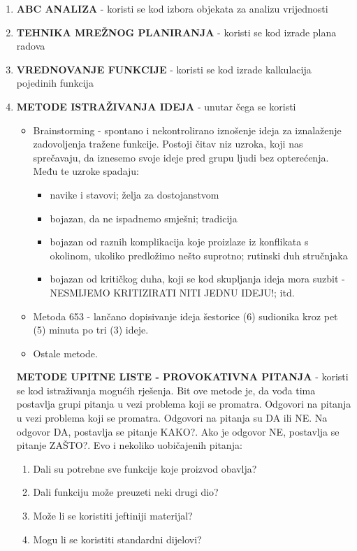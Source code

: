 \documentclass[a4paper,12pt]{article}
\numberwithin{figure}{section}
\begin{document}
\begin{enumerate}
\item \textbf{ABC ANALIZA} - koristi se kod izbora objekata za analizu vrijednosti
\item \textbf{TEHNIKA MREŽNOG PLANIRANJA} - koristi se kod izrade plana radova
\item \textbf{VREDNOVANJE FUNKCIJE} - koristi se kod izrade kalkulacija pojedinih funkcija
\item \textbf{METODE ISTRAŽIVANJA IDEJA} - unutar čega se koristi
\begin{itemize}
\item Brainstorming - spontano i nekontrolirano iznošenje ideja za iznalaženje zadovoljenja tražene funkcije. Postoji čitav niz uzroka, koji nas sprečavaju, da iznesemo svoje ideje pred grupu ljudi bez opterećenja. Među te uzroke spadaju:
\begin{itemize}
\item navike i stavovi; želja za dostojanstvom
\item bojazan, da ne ispadnemo smješni; tradicija
\item bojazan od raznih komplikacija koje proizlaze iz konflikata s okolinom, ukoliko predložimo nešto suprotno; rutinski duh stručnjaka
\item bojazan od kritičkog duha, koji se kod skupljanja ideja mora suzbit - NESMIJEMO KRITIZIRATI NITI JEDNU IDEJU!; itd.
\end{itemize}  
\item Metoda 653 - lančano dopisivanje ideja šestorice (6) sudionika kroz pet (5) minuta po tri (3) ideje.
\item Ostale metode. 
\end{itemize}
\textbf{METODE UPITNE LISTE - PROVOKATIVNA PITANJA} - koristi se kod istraživanja mogućih rješenja. Bit ove metode je, da vođa tima postavlja grupi pitanja u vezi problema koji se promatra. Odgovori na pitanja u vezi problema koji se promatra. Odgovori na pitanja su DA ili NE. Na odgovor DA, postavlja se pitanje KAKO?.  Ako je odgovor NE, postavlja se pitanje ZAŠTO?. Evo i nekoliko uobičajenih pitanja:
\begin{center}
\begin{enumerate}
\item Dali su potrebne sve funkcije koje proizvod obavlja?
\item Dali funkciju može preuzeti neki drugi dio?
\item Može li se koristiti jeftiniji materijal?
\item Mogu li se koristiti standardni dijelovi?

\end{enumerate}
\end{center}
\end{enumerate}
\end{document}
